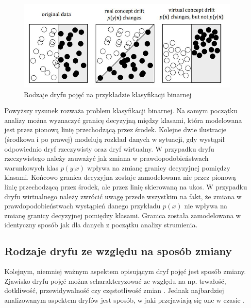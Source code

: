 \begin{figure}[h] 
    \centering\includegraphics[width=14cm]{figures/types_of_drift.JPG}
    \caption{Rodzaje dryfu pojęć na przykładzie klasyfikacji binarnej \cite{Article:DriftGama2}}
\end{figure}

\noindent Powyższy rysunek rozważa problem klasyfikacji binarnej. Na samym początku analizy można wyznaczyć granicę decyzyjną między klasami, która modelowana jest przez pionową linię przechodzącą przez środek. Kolejne dwie ilustracje (środkowa i po prawej) modelują rozkład danych w sytuacji, gdy wystąpił odpowiednio dryf rzeczywisty oraz dryf wirtualny. W przypadku dryfu rzeczywistego należy zauważyć jak zmiana w prawdopodobieństwach warunkowych klas $p(y|x)$ wpływa na zmianę granicy decyzyjnej pomiędzy klasami. Końcowo granica decyzyjna zostaje zamodelowana nie przez pionową linię przechodzącą przez środek, ale przez linię skierowaną na ukos. W przypadku dryfu wirtualnego należy zwrócić uwagę przede wszystkim na fakt, że zmiana w prawdopodobieństwach wystąpień danego przykładu $p(x)$ nie wpływa na zmianę granicy decyzyjnej pomiędzy klasami. Granica została zamodelowana w identyczny sposób jak dla danych z początku analizy strumienia.

\subsection{Rodzaje dryfu ze względu na sposób zmiany}

\noindent Kolejnym, niemniej ważnym aspektem opisującym dryf pojęć jest sposób zmiany. Zjawisko dryfu pojęć można scharakteryzować ze względu na np. trwałość, dotkliwość, przewidywalność czy częstotliwość zmian \cite{Article:DriftType}\cite{Article:DriftType2}. Jednak najbardziej analizowanym aspektem dryfów jest sposób, w jaki przejawiają się one w czasie \cite{Article:DriftGama}\cite{Article:DriftType3}.

\newpage

